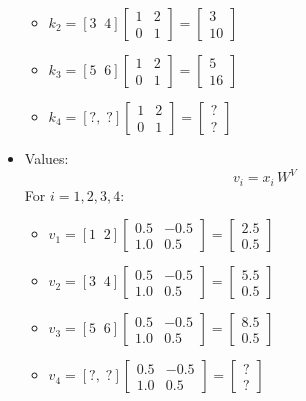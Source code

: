 \begin{itemize}
\begin{itemize}
		   \item \(k_2 = [3\;\;4] \begin{bmatrix}1 & 2 \\ 0 & 1\end{bmatrix} 
			 = \begin{bmatrix}3 \\ 10\end{bmatrix}\)
		   \item \(k_3 = [5\;\;6] \begin{bmatrix}1 & 2 \\ 0 & 1\end{bmatrix} 
			 = \begin{bmatrix}5 \\ 16\end{bmatrix}\)
		   \item \(k_4 = [?,\; ?] \begin{bmatrix}1 & 2 \\ 0 & 1\end{bmatrix} 
			 = \begin{bmatrix}? \\ ?\end{bmatrix}\)
	   \end{itemize}
	\item Values:
	   \[
		 v_i = x_i \, W^V
	   \]
	   For \(i=1,2,3,4\):
	   \begin{itemize}
		   \item \(v_1 = [1\;\;2] \begin{bmatrix}0.5 & -0.5 \\ 1.0 & 0.5\end{bmatrix} 
			 = \begin{bmatrix}2.5 \\ 0.5\end{bmatrix}\)
		   \item \(v_2 = [3\;\;4] \begin{bmatrix}0.5 & -0.5 \\ 1.0 & 0.5\end{bmatrix} 
			 = \begin{bmatrix}5.5 \\ 0.5\end{bmatrix}\)
		   \item \(v_3 = [5\;\;6] \begin{bmatrix}0.5 & -0.5 \\ 1.0 & 0.5\end{bmatrix} 
			 = \begin{bmatrix}8.5 \\ 0.5\end{bmatrix}\)
		   \item \(v_4 = [?,\; ?] \begin{bmatrix}0.5 & -0.5 \\ 1.0 & 0.5\end{bmatrix} 
			 = \begin{bmatrix}? \\ ?\end{bmatrix}\)
	   \end{itemize}
\end{itemize}

